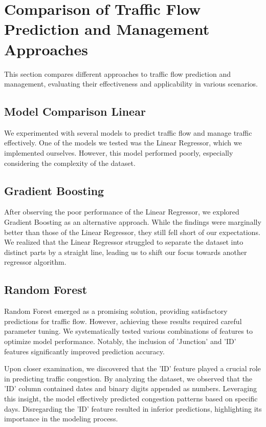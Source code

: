 \documentclass{IEEEtran}
\begin{document}
\section{Comparison of Traffic Flow Prediction and Management Approaches}

This section compares different approaches to traffic flow prediction and management, evaluating their effectiveness and applicability in various scenarios.
\subsection{Model Comparison Linear}

We experimented with several models to predict traffic flow and manage traffic effectively. One of the models we tested was the Linear Regressor, which we implemented ourselves. However, this model performed poorly, especially considering the complexity of the dataset. 

\subsection{Gradient Boosting}

After observing the poor performance of the Linear Regressor, we explored Gradient Boosting as an alternative approach. While the findings were marginally better than those of the Linear Regressor, they still fell short of our expectations. We realized that the Linear Regressor struggled to separate the dataset into distinct parts by a straight line, leading us to shift our focus towards another regressor algorithm.

\subsection{Random Forest}

Random Forest emerged as a promising solution, providing satisfactory predictions for traffic flow. However, achieving these results required careful parameter tuning. We systematically tested various combinations of features to optimize model performance. Notably, the inclusion of 'Junction' and 'ID' features significantly improved prediction accuracy.

Upon closer examination, we discovered that the 'ID' feature played a crucial role in predicting traffic congestion. By analyzing the dataset, we observed that the 'ID' column contained dates and binary digits appended as numbers. Leveraging this insight, the model effectively predicted congestion patterns based on specific days. Disregarding the 'ID' feature resulted in inferior predictions, highlighting its importance in the modeling process.
\end{document}
